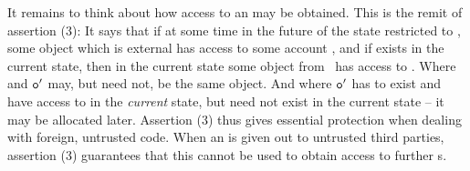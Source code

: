 It remains to think about how access to an  may be obtained. This is the remit of assertion (3): 
It says that if at some time in the future of the state restricted to \SF, 
some object  which is external has access to some account , and if  exists in the 
current state, then in the current state some object 
from \SF~has access to . Where  and ${\mbox{\tt{o}}}'$ may, but need not, be the same object. And where
 ${\mbox{\tt{o}}}'$ has to exist and have access to  in the \emph{current} state, but 
 need not exist in the current state -- it may be allocated later.
Assertion (3) thus gives essential protection when dealing with foreign, untrusted code.
When an  is given out to untrusted third parties, assertion (3) guarantees that
this  cannot be used to obtain access to further  s. 


\vspace{.1cm}

